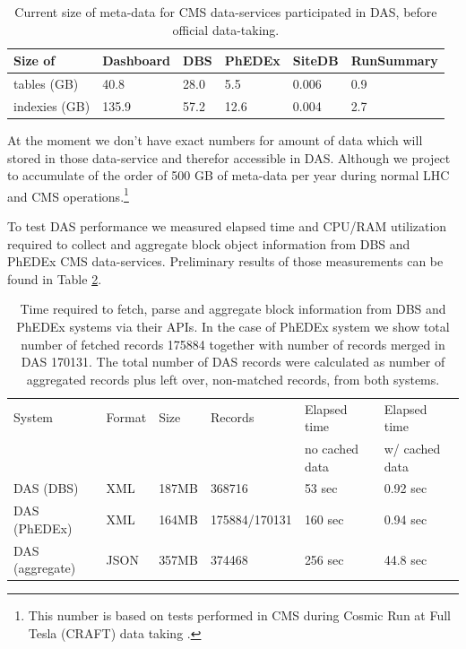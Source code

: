 \documentclass[a4paper]{jpconf}
\begin{document}
\begin{table}[hbt]
\centering
\begin{tabular}{llllll}\hline
\hline

Size of  & Dashboard & DBS & PhEDEx & SiteDB & RunSummary \\
\hline
tables (GB) & 40.8  & 28.0 & 5.5 & 0.006 & 0.9 \\
indexies (GB) & 135.9 & 57.2 & 12.6 & 0.004 & 2.7 \\
\hline
\hline
\end{tabular}
\caption{
Current size of meta-data for CMS data-services participated in DAS, before
official data-taking. 
}
\label{db_size}
\end{table}

At the moment we don't have exact numbers for amount of data which will stored 
in those data-service and therefor accessible in DAS. Although we project to
accumulate of the order of 500 GB of meta-data per year during normal LHC and CMS
operations.\footnote{This number is based on tests 
performed in CMS during Cosmic Run at Full Tesla (CRAFT) data taking \cite{CRAFT09}.}

To test DAS performance we measured elapsed time and CPU/RAM utilization
required to collect and aggregate block object information from DBS and 
PhEDEx CMS data-services. Preliminary results of those measurements can
be found in Table \ref{DAS_benchmark}. 

\begin{table}[hbt]
\centering
\begin{tabular}{llllll}\hline
\hline

System & Format & Size & Records & Elapsed time & Elapsed time \\
& & & & no cached data & w/ cached data \\
\hline
DAS (DBS) & XML & 187MB & 368716 & 53 sec & 0.92 sec \\
DAS (PhEDEx) & XML & 164MB & 175884/170131 & 160 sec & 0.94 sec \\
DAS (aggregate) & JSON & 357MB & 374468 & 256 sec & 44.8 sec \\
\hline
\hline
\end{tabular}
\caption{Time required to fetch, parse and aggregate block information
from DBS and PhEDEx systems via their APIs. In the case of PhEDEx
system we show total number of fetched records 175884 together with
number of records merged in DAS 170131. The total number of DAS records 
were calculated as number of aggregated records plus left over, non-matched records,
from both systems.}
\label{DAS_benchmark}
\end{table}
\end{document}

